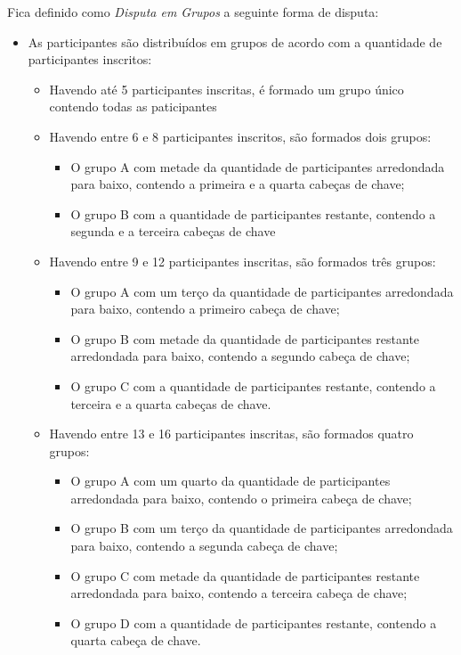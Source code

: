 \noindent
Fica definido como \textit{Disputa em Grupos} a seguinte forma de disputa:
\begin{itemize}[noitemsep]
	\item As participantes são distribuídos em grupos de acordo com a quantidade de participantes inscritos:
	\begin{itemize}[noitemsep]
		\item Havendo até 5 participantes inscritas, é formado um grupo único contendo todas as paticipantes

		\item Havendo entre 6 e 8 participantes inscritos, são formados dois grupos:
		\begin{itemize}[noitemsep]
			\item O grupo A com metade da quantidade de participantes arredondada para baixo, contendo a primeira e a quarta cabeças de chave;
			\item O grupo B com a quantidade de participantes restante, contendo a segunda e a terceira cabeças de chave
		\end{itemize}

		\item Havendo entre 9 e 12 participantes inscritas, são formados três grupos:
		\begin{itemize}[noitemsep]
			\item O grupo A com um terço da quantidade de participantes arredondada para baixo, contendo a primeiro cabeça de chave;
			\item O grupo B com metade da quantidade de participantes restante arredondada para baixo, contendo a segundo cabeça de chave;
			\item O grupo C com a quantidade de participantes restante, contendo a terceira e a quarta cabeças de chave.
		\end{itemize}

		\item Havendo entre 13 e 16 participantes inscritas, são formados quatro grupos:
		\begin{itemize}[noitemsep]
			\item O grupo A com um quarto da quantidade de participantes arredondada para baixo, contendo o primeira cabeça de chave;
			\item O grupo B com um terço da quantidade de participantes arredondada para baixo, contendo a segunda cabeça de chave;
			\item O grupo C com metade da quantidade de participantes restante arredondada para baixo, contendo a terceira cabeça de chave;
			\item O grupo D com a quantidade de participantes restante, contendo a quarta cabeça de chave.
		\end{itemize}
	\end{itemize}


\end{itemize}
